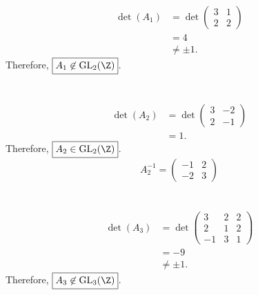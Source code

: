 \documentclass[
  coursecode={MTHE 418},
  assignmentname={Homework \homeworknumber},
  studentnumber=20053722,
  name={Bryan Hoang},
  draft,
]{
  ltxanswer%
}
\begin{document}
  \begin{questions}
    \setcounter{question}{\questionnumber}
    \addtocounter{question}{-1}
    \question[10]\
    \begin{parts}
      \part{}
      \begin{solution}
        \begin{align*}
          \det(A_{1}) &= \det\begin{pmatrix}3&1\\2&2\end{pmatrix} \\
                      &= 4                                        \\
                      &\ne \pm 1.
        \end{align*}
        Therefore, \(\boxed{A_{1} \not\in \mathrm{GL}_{2}(\Z)}\).
      \end{solution}

      \part{}
      \begin{solution}
        \begin{align*}
          \det(A_{2}) &= \det\begin{pmatrix}3&-2\\2&-1\end{pmatrix} \\
                      &= 1.
        \end{align*}
        Therefore, \(\boxed{A_{2} \in \mathrm{GL}_{2}(\Z)}\).
        \begin{equation*}
          \boxed{A_{2}^{-1} = \begin{pmatrix}-1&2\\-2&3\end{pmatrix}}
        \end{equation*}
      \end{solution}

      \part{}
      \begin{solution}
        \begin{align*}
          \det(A_{3}) &= \det\begin{pmatrix}3&2&2\\2&1&2\\-1&3&1\end{pmatrix} \\
                      &= -9                                                             \\
                      &\ne \pm 1.
        \end{align*}
        Therefore, \(\boxed{A_{3} \not\in \mathrm{GL}_{3}(\Z)}\).
      \end{solution}


\end{parts}
\end{questions}
\end{document}
